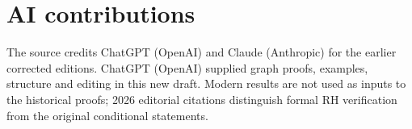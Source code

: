 \documentclass[12pt,letterpaper]{article}
\begin{document}
\section{AI contributions}
The source credits ChatGPT (OpenAI) and Claude (Anthropic)
for the earlier corrected editions. ChatGPT (OpenAI)
supplied graph proofs, examples, structure and editing
in this new draft. Modern results are not used as inputs to the historical proofs; 2026 editorial citations distinguish formal RH verification from the original conditional statements.
\end{document}
